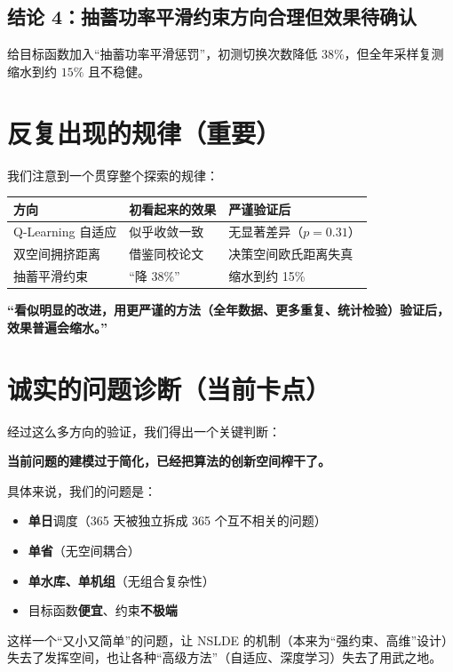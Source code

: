 \documentclass[11pt,a4paper]{ctexart}
\begin{document}
\subsection{结论 4：抽蓄功率平滑约束方向合理但效果待确认}

给目标函数加入``抽蓄功率平滑惩罚''，初测切换次数降低 $38\%$，但全年采样复测缩水到约 $15\%$ 且不稳健。

\section{反复出现的规律（重要）}

我们注意到一个贯穿整个探索的规律：

\begin{center}
\begin{tabular}{lll}
\toprule
\textbf{方向} & \textbf{初看起来的效果} & \textbf{严谨验证后} \\
\midrule
Q-Learning 自适应 & 似乎收敛一致 & 无显著差异（$p=0.31$）\\
双空间拥挤距离 & 借鉴同校论文 & 决策空间欧氏距离失真 \\
抽蓄平滑约束 & ``降 38\%'' & 缩水到约 15\% \\
\bottomrule
\end{tabular}
\end{center}

\textbf{``看似明显的改进，用更严谨的方法（全年数据、更多重复、统计检验）验证后，效果普遍会缩水。''}

\section{诚实的问题诊断（当前卡点）}

经过这么多方向的验证，我们得出一个关键判断：

\textbf{当前问题的建模过于简化，已经把算法的创新空间榨干了。}

具体来说，我们的问题是：
\begin{itemize}[itemsep=0pt]
  \item \textbf{单日}调度（365 天被独立拆成 365 个互不相关的问题）
  \item \textbf{单省}（无空间耦合）
  \item \textbf{单水库、单机组}（无组合复杂性）
  \item 目标函数\textbf{便宜}、约束\textbf{不极端}
\end{itemize}

这样一个``又小又简单''的问题，让 NSLDE 的机制（本来为``强约束、高维''设计）失去了发挥空间，也让各种``高级方法''（自适应、深度学习）失去了用武之地。
\end{document}
